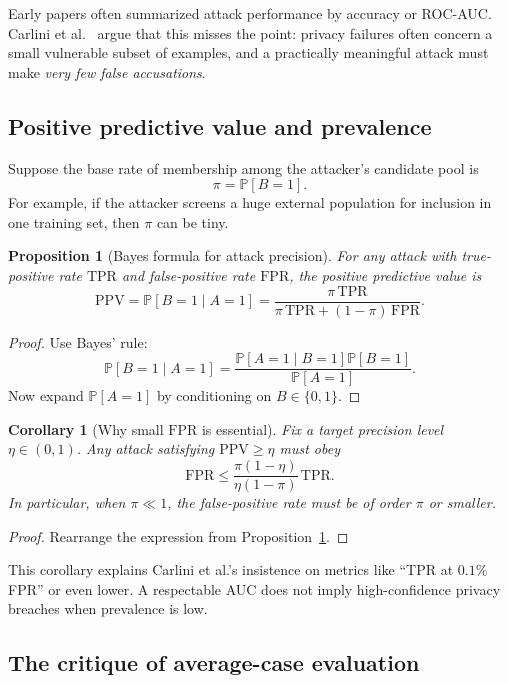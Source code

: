 \documentclass[11pt]{article}
\newtheorem{proposition}[theorem]{Proposition}
\newtheorem{corollary}[theorem]{Corollary}
\theoremstyle{definition}
\newcommand{\1}{\mathbf{1}}
\newcommand{\TPR}{\mathrm{TPR}}
\newcommand{\FPR}{\mathrm{FPR}}
\newcommand{\PPV}{\mathrm{PPV}}
\newcommand{\Pbb}{\mathbb{P}}
\begin{document}
Early papers often summarized attack performance by accuracy or ROC-AUC. Carlini et al.~\cite{carlini2022} argue that this misses the point: privacy failures often concern a small vulnerable subset of examples, and a practically meaningful attack must make \emph{very few false accusations}.

\subsection{Positive predictive value and prevalence}

Suppose the base rate of membership among the attacker's candidate pool is
\[
\pi = \Pbb[B=1].
\]
For example, if the attacker screens a huge external population for inclusion in one training set, then $\pi$ can be tiny.

\begin{proposition}[Bayes formula for attack precision]\label{prop:ppv}
For any attack with true-positive rate $\TPR$ and false-positive rate $\FPR$, the positive predictive value is
\[
\PPV = \Pbb[B=1 \mid A=1] = \frac{\pi\,\TPR}{\pi\,\TPR + (1-\pi)\,\FPR}.
\]
\end{proposition}

\begin{proof}
Use Bayes' rule:
\[
\Pbb[B=1 \mid A=1] = \frac{\Pbb[A=1 \mid B=1]\Pbb[B=1]}{\Pbb[A=1]}.
\]
Now expand $\Pbb[A=1]$ by conditioning on $B \in \{0,1\}$.
\end{proof}

\begin{corollary}[Why small $\FPR$ is essential]
Fix a target precision level $\eta \in (0,1)$. Any attack satisfying $\PPV \ge \eta$ must obey
\[
\FPR \le \frac{\pi(1-\eta)}{\eta(1-\pi)}\, \TPR.
\]
In particular, when $\pi \ll 1$, the false-positive rate must be of order $\pi$ or smaller.
\end{corollary}

\begin{proof}
Rearrange the expression from Proposition~\ref{prop:ppv}.
\end{proof}

This corollary explains Carlini et al.'s insistence on metrics like ``TPR at $0.1\%$ FPR'' or even lower. A respectable AUC does not imply high-confidence privacy breaches when prevalence is low.

\subsection{The critique of average-case evaluation}
\end{document}
